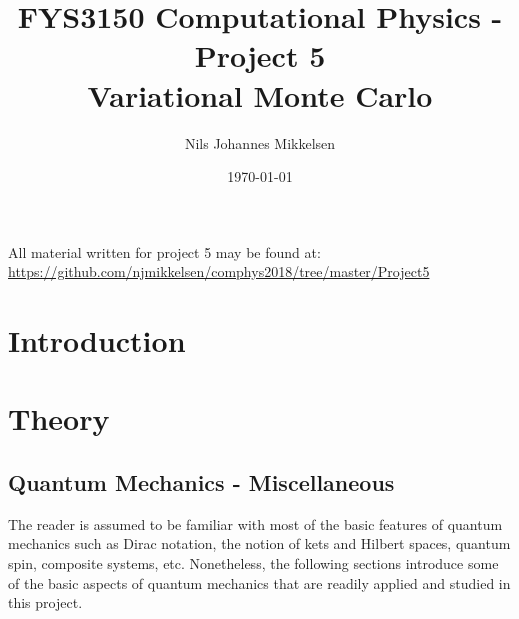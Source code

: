 \documentclass[nofootinbib,reprint,english]{revtex4-1}
\begin{document}
\title{FYS3150 Computational Physics - Project 5\\Variational Monte Carlo}
\author{Nils Johannes Mikkelsen}
\date{\today}
\noaffiliation
\begin{abstract}

\end{abstract}
\maketitle
All material written for project 5 may be found at:\\
{\scriptsize\url{https://github.com/njmikkelsen/comphys2018/tree/master/Project5}}
\section{Introduction}

\section{Theory}
\subsection{Quantum Mechanics - Miscellaneous}
The reader is assumed to be familiar with most of the basic features of quantum mechanics such as Dirac notation, the notion of kets and Hilbert spaces, quantum spin, composite systems, etc. Nonetheless, the following sections introduce some of the basic aspects of quantum mechanics that are readily applied and studied in this project.
\end{document}
